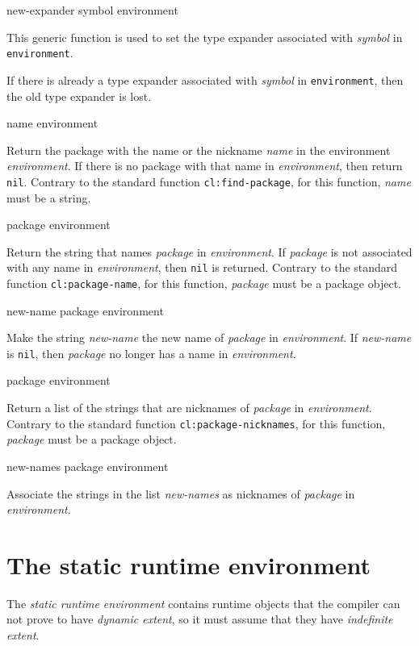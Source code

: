  {new-expander symbol environment}

This generic function is used to set the type expander associated with
\textit{symbol} in \texttt{environment}.

If there is already a type expander associated with \textit{symbol} in
\texttt{environment}, then the old type expander is lost.

 {name environment}

Return the package with the name or the nickname \textit{name} in the
environment \textit{environment}.  If there is no package with that
name in \textit{environment}, then return \texttt{nil}.  Contrary to
the standard \commonlisp{} function \texttt{cl:find-package}, for this
function, \textit{name} must be a string.

 {package environment}

Return the string that names \textit{package} in \textit{environment}.
If \textit{package} is not associated with any name in
\textit{environment}, then \texttt{nil} is returned.  Contrary to the
standard \commonlisp{} function \texttt{cl:package-name}, for this
function, \textit{package} must be a package object.

 {new-name package environment}

Make the string \textit{new-name} the new name of \textit{package} in
\textit{environment}.  If \textit{new-name} is \texttt{nil}, then
\textit{package} no longer has a name in \textit{environment}.

 {package environment}

Return a list of the strings that are nicknames of \textit{package} in
\textit{environment}.  Contrary to the standard \commonlisp{} function
\texttt{cl:package-nicknames}, for this function, \textit{package}
must be a package object.

 {new-names package environment}

Associate the strings in the list \textit{new-names} as nicknames of
\textit{package} in \textit{environment}.

\section{The static runtime environment}
\label{sec-environments-static-runtime}

The \emph{static runtime environment} contains runtime objects that
the compiler can not prove to have \emph{dynamic extent}, so it must
assume that they have \emph{indefinite extent}.  

